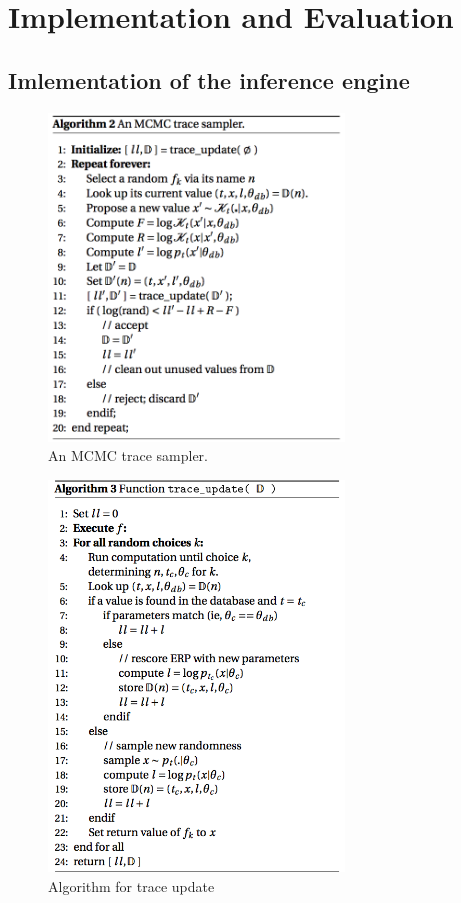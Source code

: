 \chapter{Implementation and Evaluation}
\label{chap:eval}
\section{Imlementation of the inference engine}
\begin{figure}
    \centering
    \includegraphics[width=0.7\textwidth]{figures/trace1.png}
    \caption{An MCMC trace sampler.}
    \label{fig:trace1}
\end{figure}

\begin{figure}
    \centering
    \includegraphics[width=0.7\textwidth]{figures/trace2.png}
    \caption{Algorithm for trace update}
    \label{fig:trace2}
\end{figure}

